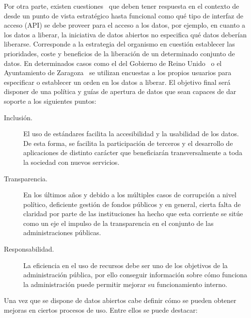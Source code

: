 Por otra parte, existen cuestiones~\cite{publishing-ogd} que deben tener respuesta en el contexto de \ogd desde un punto
de vista estratégico hasta funcional como qué tipo de interfaz de acceso (\gls{API}) se debe proveer para el acceso a los datos, por ejemplo, 
en cuanto a los datos a liberar, la iniciativa de datos abiertos no especifica qué datos deberían liberarse. Corresponde
a la estrategia del organismo en cuestión establecer las prioridades, coste y beneficios de la liberación de un determinado conjunto
de datos. En determinados casos como el del Gobierno de Reino Unido~\cite{uk-survey} o el Ayuntamiento de Zaragoza~\cite{zar-survey} se utilizan encuestas
a los propios usuarios para especificar o establecer un orden en los datos a liberar. El objetivo final será
disponer de una política y guías de apertura de datos que sean capaces de dar soporte a los siguientes puntos:

\begin{description}
 \item [Inclusión.] El uso de estándares facilita la accesibilidad y la usabilidad de los datos. De esta forma,
se facilita la participación de terceros y el desarrollo de aplicaciones de distinto carácter que beneficiarán
transversalmente a toda la sociedad con nuevos servicios.
\item [Transparencia.] En los últimos años y debido a los múltiples casos de corrupción a nivel político, deficiente gestión
de fondos públicos y en general, cierta falta de claridad por parte de las instituciones ha hecho que esta corriente
se sitúe como un eje el impulso de la transparencia en el conjunto de las administraciones públicas.
\item [Responsabilidad.] La eficiencia en el uso de recursos debe ser uno de los objetivos de la administración pública, por ello
conseguir información sobre cómo funciona la administración puede permitir mejorar su funcionamiento interno.
\end{description}

Una vez que se dispone de datos abiertos cabe definir cómo se pueden obtener mejoras en ciertos procesos de uso. Entre 
ellos se puede destacar:


